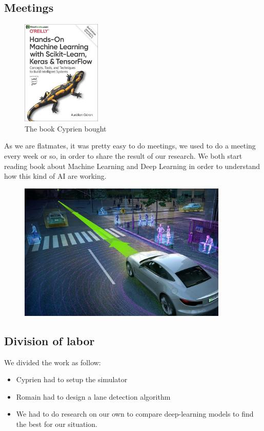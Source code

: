 \subsection{Meetings}
\begin{figure}
\centering
\includegraphics[height=5cm]{img/handsonml.jpeg}
\caption{The book Cyprien bought}
\end{figure}
As we are flatmates, it was pretty easy to do meetings, we used to do a meeting every week or so, in order to share the result of our research. We both start reading book about Machine Learning and Deep Learning in order to understand how this kind of AI are working\cite{2ndEd}.

\clearpage



\begin{figure}[!h]
\centering
\includegraphics[width=10cm]{img/autonomous_driving.jpeg}
\end{figure}

\subsection{Division of labor}

We divided the work as follow:
\begin{itemize}
\item Cyprien had to setup the simulator
\item Romain had to design a lane detection algorithm 
\item We had to do research on our own to compare deep-learning models to find the best for our situation.
\end{itemize}
\clearpage
